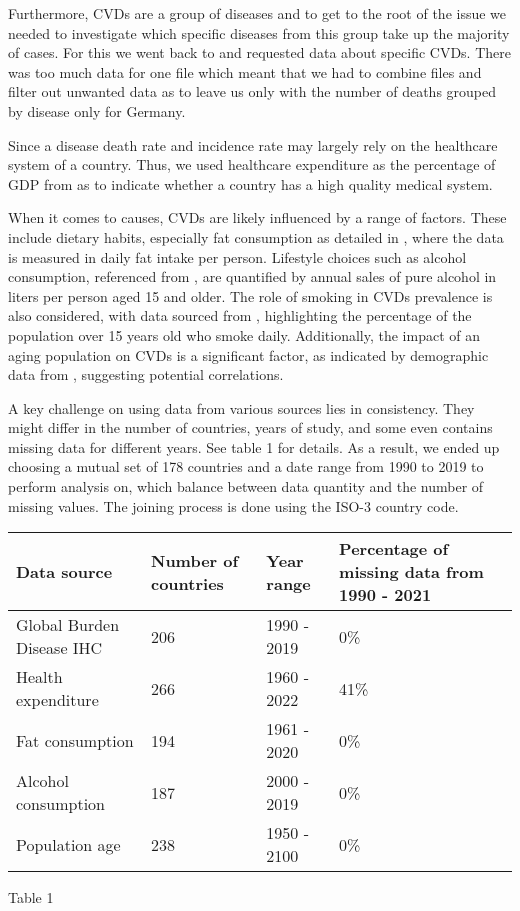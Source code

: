 Furthermore, CVDs are a group of diseases and to get to the root of the issue we needed to investigate which specific diseases from this group take up the majority of cases. For this we went back to \citep{GBD2019} and requested data about specific CVDs. There was too much data for one file which meant that we had to combine files and filter out unwanted data as to leave us only with the number of deaths grouped by disease only for Germany. 

Since a disease death rate and incidence rate may largely rely on the healthcare system of a country. Thus, we used healthcare expenditure as the percentage of GDP from \citep{health_expenditure} as to indicate whether a country has a high quality medical system.

When it comes to causes, CVDs are likely influenced by a range of factors. These include dietary habits, especially fat consumption as detailed in \citep{fat_consumption}, where the data is measured in daily fat intake per person. Lifestyle choices such as alcohol consumption, referenced from \citep{alcohol_consumption}, are quantified by annual sales of pure alcohol in liters per person aged 15 and older. The role of smoking in CVDs prevalence is also considered, with data sourced from \citep{smoking}, highlighting the percentage of the population over 15 years old who smoke daily. Additionally, the impact of an aging population on CVDs is a significant factor, as indicated by demographic data from \citep{age}, suggesting potential correlations. 

A key challenge on using data from various sources lies in consistency. They might differ in the number of countries, years of study, and some even contains missing data for different years. See table 1 for details. As a result, we ended up choosing a mutual set of 178 countries and a date range from 1990 to 2019 to perform analysis on, which balance between data quantity and the number of missing values. The joining process is done using the ISO-3 country code.


\begin{tabular}{|p{2cm}|p{1cm}|p{2cm}|p{2cm}|}
\hline
Data source & Number of countries & Year range & Percentage of missing data from 1990 - 2021\\
\hline
Global Burden Disease IHC & 206 & 1990 - 2019 & 0\%\\
Health expenditure & 266 & 1960 - 2022 & 41\%\\
Fat consumption & 194 & 1961 - 2020 & 0\%\\
Alcohol consumption & 187 & 2000 - 2019 & 0\%\\
Population age & 238 & 1950 - 2100 & 0\%\\
\hline
\end{tabular}
Table 1